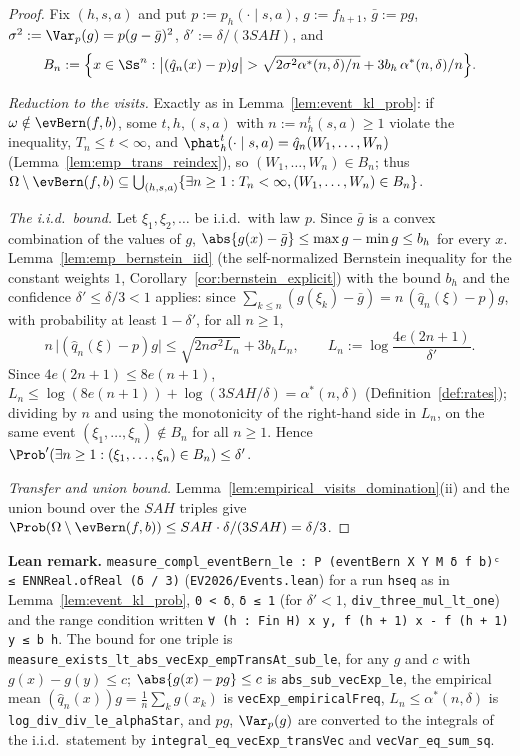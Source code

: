 \begin{proof}
\leanok
Fix $(h, s, a)$ and put $p := p_h(\cdot \mid s, a)$, $g := f_{h+1}$, $\bar g := pg$,
$\sigma^2 := \Var_p(g) = p(g - \bar g)^2$, $\delta' := \delta/(3SAH)$, and
\[
  B_n := \Big\{x \in \Ss^n : \big|(\hat q_n(x) - p) g\big| > \sqrt{2 \sigma^2 \alpha^*(n, \delta)/n} + 3 b_h\, \alpha^*(n, \delta)/n\Big\} .
\]

\emph{Reduction to the visits.} Exactly as in Lemma~\ref{lem:event_kl_prob}: if
$\omega \notin \evBern(f, b)$, some $t, h, (s, a)$ with $n := n_h^t(s, a) \ge 1$ violate the inequality,
$T_n \le t < \infty$, and $\phat_h^t(\cdot \mid s, a) = \hat q_n(W_1, \dots, W_n)$
(Lemma~\ref{lem:emp_trans_reindex}), so $(W_1, \dots, W_n) \in B_n$; thus
$\Omega \setminus \evBern(f, b) \subseteq \bigcup_{(h, s, a)} \{\exists n \ge 1 : T_n < \infty, (W_1, \dots, W_n) \in B_n\}$.

\emph{The i.i.d.\ bound.} Let $\xi_1, \xi_2, \dots$ be i.i.d.\ with law $p$. Since $\bar g$ is a
convex combination of the values of $g$, $\abs{g(x) - \bar g} \le \max g - \min g \le b_h$ for every
$x$. Lemma~\ref{lem:emp_bernstein_iid} (the self-normalized Bernstein inequality for the constant
weights $1$, Corollary~\ref{cor:bernstein_explicit}) with the bound $b_h$ and the confidence
$\delta' \le \delta/3 < 1$ applies: since $\sum_{k \le n} (g(\xi_k) - \bar g) = n\,(\hat q_n(\xi) - p) g$,
with probability at least $1 - \delta'$, for all $n \ge 1$,
\[
  n\,\big|(\hat q_n(\xi) - p) g\big| \le \sqrt{2 n \sigma^2 L_n} + 3 b_h L_n,
  \qquad L_n := \log\frac{4e(2n + 1)}{\delta'} .
\]
Since $4e(2n + 1) \le 8e(n + 1)$, $L_n \le \log(8e(n + 1)) + \log(3SAH/\delta) = \alpha^*(n, \delta)$
(Definition~\ref{def:rates}); dividing by $n$ and using the monotonicity of the right-hand side
in $L_n$, on the same event $(\xi_1, \dots, \xi_n) \notin B_n$ for all $n \ge 1$. Hence
$\Prob'(\exists n \ge 1 : (\xi_1, \dots, \xi_n) \in B_n) \le \delta'$.

\emph{Transfer and union bound.} Lemma~\ref{lem:empirical_visits_domination}(ii) and the union
bound over the $SAH$ triples give $\Prob(\Omega \setminus \evBern(f, b)) \le SAH \cdot \delta/(3SAH) = \delta/3$.
\end{proof}

\textbf{Lean remark.} \texttt{measure\_compl\_eventBern\_le : P (eventBern X Y M δ f b)ᶜ ≤ ENNReal.ofReal (δ / 3)}
(\texttt{EV2026/Events.lean}) for a run \texttt{hseq} as in Lemma~\ref{lem:event_kl_prob},
\texttt{0 < δ}, \texttt{δ ≤ 1} (for $\delta' < 1$, \texttt{div\_three\_mul\_lt\_one}) and the range
condition written \texttt{∀ (h : Fin H) x y, f (h + 1) x - f (h + 1) y ≤ b h}. The bound for one triple is
\texttt{measure\_exists\_lt\_abs\_vecExp\_empTransAt\_sub\_le}, for any $g$ and $c$ with
$g(x) - g(y) \le c$; $\abs{g(x) - pg} \le c$ is \texttt{abs\_sub\_vecExp\_le}, the empirical mean
$(\hat q_n(x)) g = \frac1n \sum_k g(x_k)$ is \texttt{vecExp\_empiricalFreq}, $L_n \le \alpha^*(n, \delta)$ is
\texttt{log\_div\_div\_le\_alphaStar}, and $pg$, $\Var_p(g)$ are converted to the integrals of the
i.i.d.\ statement by \texttt{integral\_eq\_vecExp\_transVec} and \texttt{vecVar\_eq\_sum\_sq}.

